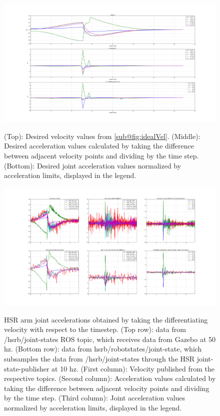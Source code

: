 \documentclass[12pt]{article}
\begin{document}
        \begin{figure}
            \centering
            \includegraphics[width=\linewidth]{2020.05.17/ideal_acc_9_6.png}
            \label{fig:accelerations_ideal}
            \caption{(Top): Desired velocity values from \cref{sub@fig:idealVel}. (Middle): Desired acceleration values calculated by taking the difference between adjacent velocity points and dividing by the time step. (Bottom): Desired joint acceleration values normalized by acceleration limits, displayed in the legend.} 
        \end{figure}   
        \begin{figure}
            \centering
            \includegraphics[width=\linewidth]{2020.05.17/accelerations_adjusted.png}
            \label{fig:accelerations_diffed}
            \caption{
                HSR arm joint accelerations obtained by taking the differentiating velocity with respect to the timestep. (Top row): data from /hsrb/joint-states ROS topic, which receives data from Gazebo at 50 hz. (Bottom row): data from hsrb/robotstates/joint-state, which subsamples the data from /hsrb/joint-states through the HSR joint-state-publisher at 10 hz. (First column): Velocity published from the respective topics. (Second column): Acceleration values calculated by taking the difference between adjacent velocity points and dividing by the time step. (Third column): Joint acceleration values normalized by acceleration limits, displayed in the legend.} 
        \end{figure}
        
\end{document}
